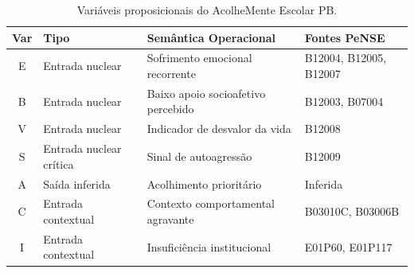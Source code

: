 
\begin{table}[H]
\centering
\caption{Variáveis proposicionais do AcolheMente Escolar PB.}
\label{tab:variaveis}
\begin{tabular}{clll}
\toprule
\textbf{Var} & \textbf{Tipo} & \textbf{Semântica Operacional} & \textbf{Fontes PeNSE} \\
\midrule
E & Entrada nuclear    & Sofrimento emocional recorrente       & B12004, B12005, B12007 \\
B & Entrada nuclear    & Baixo apoio socioafetivo percebido     & B12003, B07004 \\
V & Entrada nuclear    & Indicador de desvalor da vida          & B12008 \\
S & Entrada nuclear cr\'itica & Sinal de autoagress\~ao            & B12009 \\
A & Sa\'ida inferida    & Acolhimento priorit\'ario              & Inferida \\
C & Entrada contextual & Contexto comportamental agravante      & B03010C, B03006B \\
I & Entrada contextual & Insufici\^encia institucional           & E01P60, E01P117 \\
\bottomrule
\end{tabular}
\end{table}
